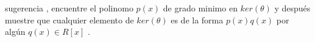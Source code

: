 \documentclass[10pt,a4paper]{article} %
\begin{document}
    sugerencia ,  encuentre el polinomo $ p(x)  $ de grado minimo en $
    ker(\theta )  $ y después muestre que cualquier elemento de $ ker(\theta )
    $ es de la forma $ p(x)q(x)  $   por algún $ q(x) \in R[x]  $ .








    \nocite{*}
    
    
\end{document}
